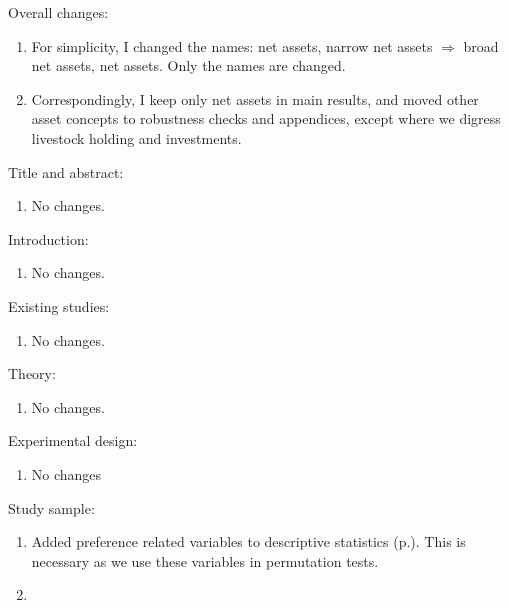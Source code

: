 \vspace{2ex}
Overall changes:
\begin{enumerate}
\vspace{1.0ex}\setlength{\itemsep}{1.0ex}\setlength{\baselineskip}{12pt}
\item	For simplicity, I changed the names: net assets, narrow net assets $\Rightarrow$ broad net assets, net assets. Only the names are changed.
\item	Correspondingly, I keep only net assets in main results, and moved other asset concepts to robustness checks and appendices, except where we digress livestock holding and investments.
\end{enumerate}
Title and abstract:
\begin{enumerate}
\vspace{1.0ex}\setlength{\itemsep}{1.0ex}\setlength{\baselineskip}{12pt}
\item	No changes.
\end{enumerate}
Introduction:
\begin{enumerate}
\vspace{1.0ex}\setlength{\itemsep}{1.0ex}\setlength{\baselineskip}{12pt}
\item	No changes.
\end{enumerate}
Existing studies:
\begin{enumerate}
\vspace{1.0ex}\setlength{\itemsep}{1.0ex}\setlength{\baselineskip}{12pt}
\item	No changes.
\end{enumerate}
Theory:
\begin{enumerate}
\vspace{1.0ex}\setlength{\itemsep}{1.0ex}\setlength{\baselineskip}{12pt}
\item	No changes.
\end{enumerate}
Experimental design:
\begin{enumerate}
\vspace{1.0ex}\setlength{\itemsep}{1.0ex}\setlength{\baselineskip}{12pt}
\item	No changes
\end{enumerate}
Study sample:
\begin{enumerate}
\vspace{1.0ex}\setlength{\itemsep}{1.0ex}\setlength{\baselineskip}{12pt}
\item	Added preference related variables to descriptive statistics (p.\pageref{StudySamplePrefDescription}). This is necessary as we use these variables in permutation tests.
\item	
\end{enumerate}
